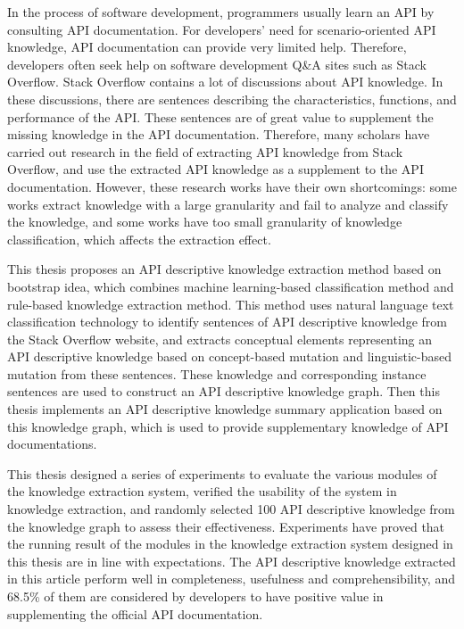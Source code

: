\documentclass[type=master, oneside]{fduthesis}
\begin{document}
\begin{abstract*}
  In the process of software development, programmers usually learn an API by consulting API documentation. For developers' need for scenario-oriented API knowledge, API documentation can provide very limited help. Therefore, developers often seek help on software development Q\&A sites such as Stack Overflow. Stack Overflow contains a lot of discussions about API knowledge. In these discussions, there are sentences describing the characteristics, functions, and performance of the API. These sentences are of great value to supplement the missing knowledge in the API documentation. Therefore, many scholars have carried out research in the field of extracting API knowledge from Stack Overflow, and use the extracted API knowledge as a supplement to the API documentation. However, these research works have their own shortcomings: some works extract knowledge with a large granularity and fail to analyze and classify the knowledge, and some works have too small granularity of knowledge classification, which affects the extraction effect.

  This thesis proposes an API descriptive knowledge extraction method based on bootstrap idea, which combines machine learning-based classification method and rule-based knowledge extraction method. This method uses natural language text classification technology to identify sentences of API descriptive knowledge from the Stack Overflow website, and extracts conceptual elements representing an API descriptive knowledge based on concept-based mutation and linguistic-based mutation from these sentences. These knowledge and corresponding instance sentences are used to construct an API descriptive knowledge graph. Then this thesis implements an API descriptive knowledge summary application based on this knowledge graph, which is used to provide supplementary knowledge of API documentations.

  This thesis designed a series of experiments to evaluate the various modules of the knowledge extraction system, verified the usability of the system in knowledge extraction, and randomly selected 100 API descriptive knowledge from the knowledge graph to assess their effectiveness. Experiments have proved that the running result of the modules in the knowledge extraction system designed in this thesis are in line with expectations. The API descriptive knowledge extracted in this article perform well in completeness, usefulness and comprehensibility, and 68.5\% of them are considered by developers to have positive value in supplementing the official API documentation.
\end{abstract*}
\end{document}
